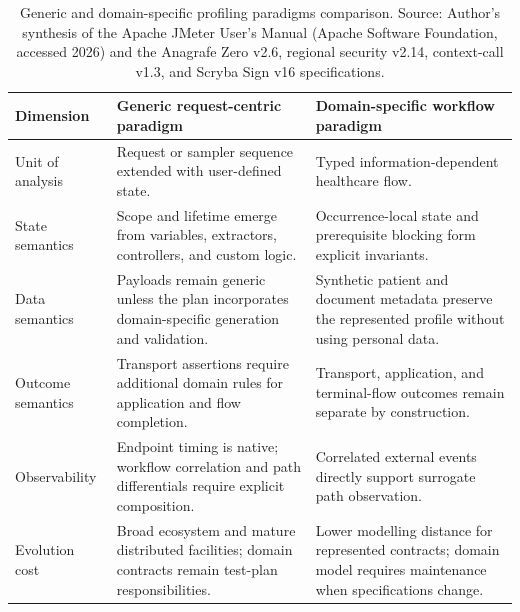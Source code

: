 \begingroup
\renewcommand{\arraystretch}{0.9}
\begin{table}[H]
    \centering
    \caption[Generic and domain-specific profiling paradigms]{Generic and
    domain-specific profiling paradigms comparison. Source: Author's synthesis of the Apache JMeter User's Manual
    (Apache Software Foundation, accessed 2026) and the Anagrafe Zero v2.6,
    regional security v2.14, context-call v1.3, and Scryba Sign v16
    specifications.}
    \label{tab:jmeter-rdg-tradeoff}
    \footnotesize
    \begin{tabular}{|>{\raggedright\arraybackslash}p{2.7cm}|>{\raggedright\arraybackslash}p{4.3cm}|>{\raggedright\arraybackslash}p{4.6cm}|}
    \hline
    \rowcolor{veryPeri!18}
    \textbf{Dimension} & \textbf{Generic request-centric paradigm} & \textbf{Domain-specific workflow paradigm} \\
    \hline
    \rowcolor{tableGray}
    Unit of analysis & Request or sampler sequence extended with user-defined state. & Typed information-dependent healthcare flow. \\
    \hline
    State semantics & Scope and lifetime emerge from variables, extractors, controllers, and custom logic. & Occurrence-local state and prerequisite blocking form explicit invariants. \\
    \hline
    \rowcolor{tableGray}
    Data semantics & Payloads remain generic unless the plan incorporates domain-specific generation and validation. & Synthetic patient and document metadata preserve the represented profile without using personal data. \\
    \hline
    Outcome semantics & Transport assertions require additional domain rules for application and flow completion. & Transport, application, and terminal-flow outcomes remain separate by construction. \\
    \hline
    \rowcolor{tableGray}
    Observability & Endpoint timing is native; workflow correlation and path differentials require explicit composition. & Correlated external events directly support surrogate path observation. \\
    \hline
    Evolution cost & Broad ecosystem and mature distributed facilities; domain contracts remain test-plan responsibilities. & Lower modelling distance for represented contracts; domain model requires maintenance when specifications change. \\
    \hline
\end{tabular}
\end{table}
\endgroup

